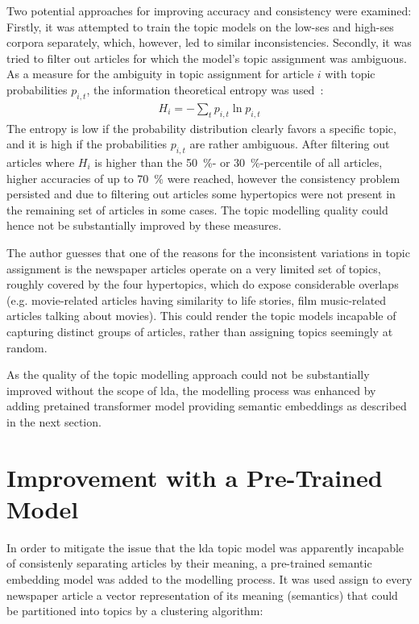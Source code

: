 Two potential approaches for improving accuracy and consistency were examined: Firstly, it was attempted to train the topic models on the low-\gls{ses} and high-\gls{ses} corpora separately, which, however, led to similar inconsistencies. Secondly, it was tried to filter out articles for which the model's topic assignment was ambiguous. As a measure for the ambiguity in topic assignment for article $i$ with topic probabilities $p_{i, t}$, the information theoretical entropy was used~\autocite{gray_entropy_2013}:
\begin{align}
    H_i = -\sum_t p_{i, t} \ln p_{i,t}
\end{align}
The entropy is low if the probability distribution clearly favors a specific topic, and it is high if the probabilities $p_{i, t}$ are rather ambiguous. After filtering out articles where $H_i$ is higher than the \SI{50}{\percent}- or \SI{30}{\percent}-percentile of all articles, higher accuracies of up to \SI{70}{\percent} were reached, however the consistency problem persisted and due to filtering out articles some hypertopics were not present in the remaining set of articles in some cases. The topic modelling quality could hence not be substantially improved by these measures.

The author guesses that one of the reasons for the inconsistent variations in topic assignment is the newspaper articles operate on a very limited set of topics, roughly covered by the four hypertopics, which do expose considerable overlaps (e.g. movie-related articles having similarity to life stories, film music-related articles talking about movies). This could render the topic models incapable of capturing distinct groups of articles, rather than assigning topics seemingly at random.

As the quality of the topic modelling approach could not be substantially improved without the scope of \gls{lda}, the modelling process was enhanced by adding pretained transformer model providing semantic embeddings as described in the next section.

\section{Improvement with a Pre-Trained Model}\label{ch:pretrained_topic_modelling}
In order to mitigate the issue that the \gls{lda} topic model was apparently incapable of consistenly separating articles by their meaning, a pre-trained semantic embedding model was added to the modelling process. It was used assign to every newspaper article a vector representation of its meaning (semantics) that could be partitioned into topics by a clustering algorithm:

